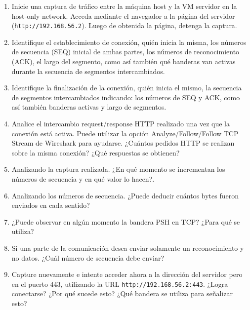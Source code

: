 \documentclass[a4paper,10pt]{article}
\begin{document}
\begin{enumerate}
    \item Inicie una captura de tráfico entre la máquina host y la VM servidor en la host-only network. Acceda mediante el navegador a la página del servidor (\texttt{http://192.168.56.2}). Luego de obtenida la página, detenga la captura.
    
    \item Identifique el establecimiento de conexión, quién inicia la misma, los números de secuencia (SEQ) inicial de ambas partes, los números de reconocimiento (ACK), el largo del segmento, como así también qué banderas van activas durante la secuencia de segmentos intercambiados.
    
    \item Identifique la finalización de la conexión, quién inicia el mismo, la secuencia de segmentos intercambiados indicando: los números de SEQ y ACK, como así también banderas activas y largo de segmentos.
    
    \item Analice el intercambio request/response HTTP realizado una vez que la conexión está activa. Puede utilizar la opción Analyze/Follow/Follow TCP Stream de Wireshark para ayudarse. ¿Cuántos pedidos HTTP se realizan sobre la misma conexión? ¿Qué respuestas se obtienen?
    
    \item Analizando la captura realizada. ¿En qué momento se incrementan los números de secuencia y en qué valor lo hacen?.

    \item Analizando los números de secuencia. ¿Puede deducir cuántos bytes fueron enviados en cada sentido? 
    
    \item ¿Puede observar en algún momento la bandera PSH en TCP? ¿Para qué se utiliza?
    
    \item Si una parte de la comunicación desea enviar solamente un reconocimiento y no datos. ¿Cuál número de secuencia debe enviar?
    
    \item Capture nuevamente e intente acceder ahora a la dirección del servidor pero en el puerto 443, utilizando la URL \texttt{http://192.168.56.2:443}. ¿Logra conectarse? ¿Por qué sucede esto? ¿Qué bandera se utiliza para señalizar esto?

\end{enumerate}
\end{document}
